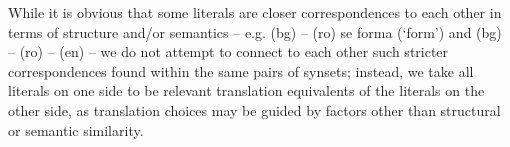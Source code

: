 \documentclass[output=paper,colorlinks,citecolor=brown]{langscibook}
\begin{document}



While it is obvious that some literals are closer correspondences to each other in terms of structure and/or semantics -- e.g. (bg)   -- (ro) {se forma} (`form') and (bg)    -- (ro)  -- (en)  -- we do not attempt to connect to each other such stricter correspondences found within the same pairs of synsets; instead, we take all literals on one side to be relevant translation equivalents of the literals on the other side, as translation choices may be guided by factors other than structural or semantic similarity.    
\end{document}
